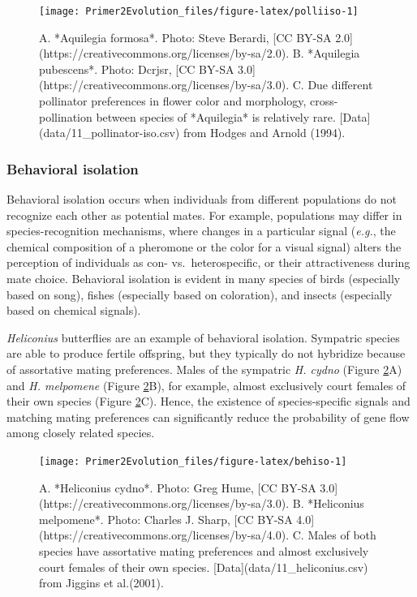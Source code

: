 \documentclass[
]{book}
\begin{document}
\begin{figure}
\texttt{[image: Primer2Evolution\_files/figure-latex/polliiso-1]} \caption{A. *Aquilegia formosa*. Photo: Steve Berardi, [CC BY-SA 2.0](https://creativecommons.org/licenses/by-sa/2.0). B. *Aquilegia pubescens*. Photo: Dcrjsr, [CC BY-SA 3.0](https://creativecommons.org/licenses/by-sa/3.0). C. Due different pollinator preferences in flower color and morphology, cross-pollination between species of *Aquilegia* is relatively rare. [Data](data/11_pollinator-iso.csv) from Hodges and Arnold (1994).}\label{fig:polliiso}
\end{figure}

\hypertarget{behavioral-isolation}{%
\subsubsection*{Behavioral isolation}\label{behavioral-isolation}}

Behavioral isolation occurs when individuals from different populations do not recognize each other as potential mates. For example, populations may differ in species-recognition mechanisms, where changes in a particular signal (\emph{e.g.}, the chemical composition of a pheromone or the color for a visual signal) alters the perception of individuals as con- vs.~heterospecific, or their attractiveness during mate choice. Behavioral isolation is evident in many species of birds (especially based on song), fishes (especially based on coloration), and insects (especially based on chemical signals).

\emph{Heliconius} butterflies are an example of behavioral isolation. Sympatric species are able to produce fertile offspring, but they typically do not hybridize because of assortative mating preferences. Males of the sympatric \emph{H. cydno} (Figure \ref{fig:behiso}A) and \emph{H. melpomene} (Figure \ref{fig:behiso}B), for example, almost exclusively court females of their own species (Figure \ref{fig:behiso}C). Hence, the existence of species-specific signals and matching mating preferences can significantly reduce the probability of gene flow among closely related species.

\begin{figure}
\texttt{[image: Primer2Evolution\_files/figure-latex/behiso-1]} \caption{A. *Heliconius cydno*. Photo: Greg Hume, [CC BY-SA 3.0](https://creativecommons.org/licenses/by-sa/3.0). B. *Heliconius melpomene*. Photo: Charles J. Sharp, [CC BY-SA 4.0](https://creativecommons.org/licenses/by-sa/4.0). C. Males of both species have assortative mating preferences and almost exclusively court females of their own species. [Data](data/11_heliconius.csv) from Jiggins et al.(2001).}\label{fig:behiso}
\end{figure}
\end{document}
